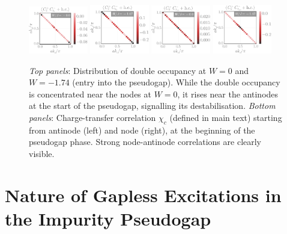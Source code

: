 \documentclass[reprint,hidelinks,onecolumn]{revtex4-2}
\begin{document}
\begin{figure}[!htpb]
	\centering
	\includegraphics[width=0.23\textwidth]{cfnode-1.pdf}
	\includegraphics[width=0.23\textwidth]{cfnode-2.pdf}
	\includegraphics[width=0.23\textwidth]{cfantinode-1.pdf}
	\includegraphics[width=0.23\textwidth]{cfantinode-2.pdf}
	\caption{{\it Top panels}: Distribution of double occupancy at \(W=0\) and \(W=-1.74\) (entry into the pseudogap). While the double occupancy is concentrated near the nodes at \(W=0\), it rises near the antinodes at the start of the pseudogap, signalling its destabilisation. {\it Bottom panels}: Charge-transfer correlation \(\chi_c\) (defined in main text) starting from antinode (left) and node (right), at the beginning of the pseudogap phase. Strong node-antinode correlations are clearly visible.}
	\label{cfnode}
\end{figure}

\section{Nature of Gapless Excitations in the Impurity Pseudogap}
\end{document}
